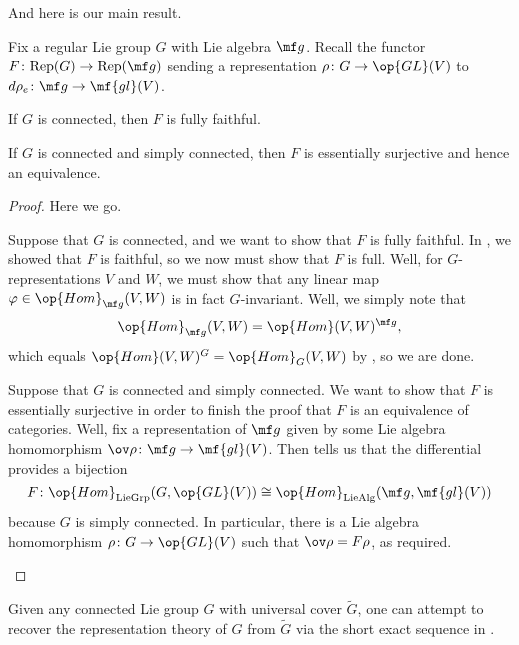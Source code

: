 \documentclass[../notes.tex]{subfiles}
\begin{document}
And here is our main result.
\begin{proposition} \label{prop:rep-theory-to-lie-alg}
	Fix a regular Lie group $G$ with Lie algebra $\mf g$. Recall the functor $F\colon\mathrm{Rep}(G)\to\mathrm{Rep}(\mf g)$ sending a representation $\rho\colon G\to\op{GL}(V)$ to $d\rho_e\colon\mf g\to\mf{gl}(V)$.
	\begin{listalph}
		\item If $G$ is connected, then $F$ is fully faithful.
		\item If $G$ is connected and simply connected, then $F$ is essentially surjective and hence an equivalence.
	\end{listalph}
\end{proposition}
\begin{proof}
	Here we go.
	\begin{listalph}
		\item Suppose that $G$ is connected, and we want to show that $F$ is fully faithful. In , we showed that $F$ is faithful, so we now must show that $F$ is full. Well, for $G$-representations $V$ and $W$, we must show that any linear map $\varphi\in\op{Hom}_{\mf g}(V,W)$ is in fact $G$-invariant. Well, we simply note that
		\[\op{Hom}_{\mf g}(V,W)=\op{Hom}(V,W)^{\mf g},\]
		which equals $\op{Hom}(V,W)^G=\op{Hom}_G(V,W)$ by , so we are done.

		\item Suppose that $G$ is connected and simply connected. We want to show that $F$ is essentially surjective in order to finish the proof that $F$ is an equivalence of categories. Well, fix a representation of $\mf g$ given by some Lie algebra homomorphism $\ov\rho\colon\mf g\to\mf{gl}(V)$. Then  tells us that the differential provides a bijection
		\[F\colon\op{Hom}_{\mathrm{LieGrp}}(G,\op{GL}(V))\cong\op{Hom}_{\mathrm{LieAlg}}(\mf g,\mf{gl}(V))\]
		because $G$ is simply connected. In particular, there is a Lie algebra homomorphism $\rho\colon G\to\op{GL}(V)$ such that $\ov\rho=F\rho$, as required.
		\qedhere
	\end{listalph}
\end{proof}
\begin{remark}
	Given any connected Lie group $G$ with universal cover $\widetilde G$, one can attempt to recover the representation theory of $G$ from $\widetilde G$ via the short exact sequence in .
\end{remark}
\end{document}
